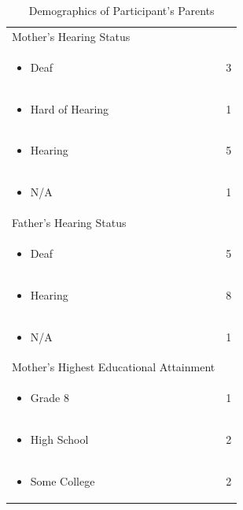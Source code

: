 \documentclass[11.5pt]{sig-alternate} %
\begin{document}
\begin{large}
\begin{table}[htbp]
\caption{Demographics of Participant's Parents}
\begin{tabular}{|l|c|}
\hline
Mother's Hearing Status & \\
\begin{itemize}[noitemsep, topsep=0pt] \item Deaf \end{itemize} & 3 \\
\begin{itemize}[noitemsep, topsep=0pt] \item Hard of Hearing \end{itemize} & 1 \\
\begin{itemize}[noitemsep, topsep=0pt] \item Hearing \end{itemize} & 5 \\
\begin{itemize}[noitemsep, topsep=0pt] \item N/A \end{itemize} & 1 \\ \hline
Father's Hearing Status & \\
\begin{itemize}[noitemsep, topsep=0pt] \item Deaf \end{itemize} & 5 \\
\begin{itemize}[noitemsep, topsep=0pt] \item Hearing \end{itemize} & 8 \\
\begin{itemize}[noitemsep, topsep=0pt] \item N/A \end{itemize} & 1 \\ \hline
Mother's Highest Educational Attainment & \\
\begin{itemize}[noitemsep, topsep=0pt] \item Grade 8 \end{itemize} & 1 \\
\begin{itemize}[noitemsep, topsep=0pt] \item High School \end{itemize} & 2 \\
\begin{itemize}[noitemsep, topsep=0pt] \item Some College \end{itemize} & 2 \\

\end{tabular}
\end{table}
\end{large}
\end{document}
